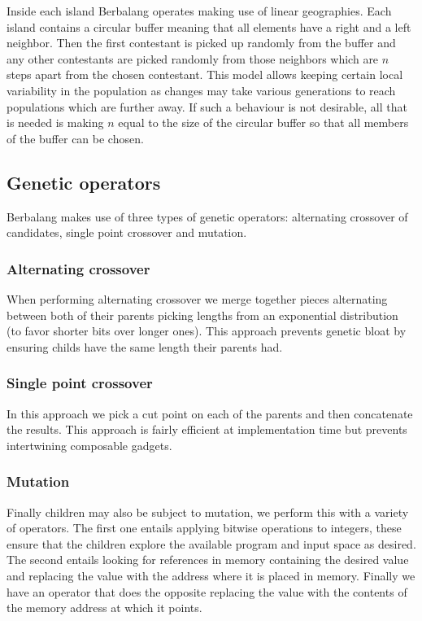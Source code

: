 \documentclass{article}
\begin{document}
Inside each island Berbalang operates making use of linear geographies. Each island contains a circular buffer meaning that all elements have a right and a left neighbor. Then the first contestant is picked up randomly from the buffer and any other contestants are picked randomly from those neighbors which are $n$ steps apart from the chosen contestant. This model allows keeping certain local variability in the population as changes may take various generations to reach populations which are further away. If such a behaviour is not desirable, all that is needed is making $n$ equal to the size of the circular buffer so that all members of the buffer can be chosen.

\subsection{Genetic operators}
Berbalang makes use of three types of genetic operators: alternating crossover of candidates, single point crossover and mutation.

\subsubsection{Alternating crossover}
When performing alternating crossover we merge together pieces alternating between both of their parents picking lengths from an exponential distribution (to favor shorter bits over longer ones). This approach prevents genetic bloat by ensuring childs have the same length their parents had.

\subsubsection{Single point crossover}
In this approach we pick a cut point on each of the parents and then concatenate the results. This approach is fairly efficient at implementation time but prevents intertwining composable gadgets.

\subsubsection{Mutation}
Finally children may also be subject to mutation, we perform this with a variety of operators. The first one entails applying bitwise operations to integers, these ensure that the children explore the available program and input space as desired. The second entails looking for references in memory containing the desired value and replacing the value with the address where it is placed in memory. Finally we have an operator that does the opposite replacing the value with the contents of the memory address at which it points.
\end{document}

